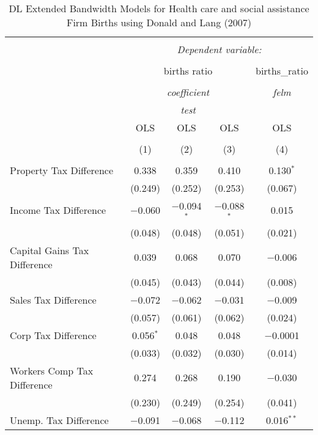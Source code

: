 
\begin{table}[!htbp] \centering 
  \caption{DL Extended Bandwidth Models for  Health care and social assistance Firm Births using Donald and Lang (2007)} 
  \label{} 
\begin{tabular}{@{\extracolsep{5pt}}lcccc} 
\\[-1.8ex]\hline 
\hline \\[-1.8ex] 
 & \multicolumn{4}{c}{\textit{Dependent variable:}} \\ 
\cline{2-5} 
\\[-1.8ex] & \multicolumn{3}{c}{births ratio} & births\_ratio \\ 
\\[-1.8ex] & \multicolumn{3}{c}{\textit{coefficient}} & \textit{felm} \\ 
 & \multicolumn{3}{c}{\textit{test}} & \textit{} \\ 
 & OLS & OLS & OLS & OLS \\ 
\\[-1.8ex] & (1) & (2) & (3) & (4)\\ 
\hline \\[-1.8ex] 
 Property Tax Difference & 0.338 & 0.359 & 0.410 & 0.130$^{*}$ \\ 
  & (0.249) & (0.252) & (0.253) & (0.067) \\ 
  Income Tax Difference & $-$0.060 & $-$0.094$^{*}$ & $-$0.088$^{*}$ & 0.015 \\ 
  & (0.048) & (0.048) & (0.051) & (0.021) \\ 
  Capital Gains Tax Difference & 0.039 & 0.068 & 0.070 & $-$0.006 \\ 
  & (0.045) & (0.043) & (0.044) & (0.008) \\ 
  Sales Tax Difference & $-$0.072 & $-$0.062 & $-$0.031 & $-$0.009 \\ 
  & (0.057) & (0.061) & (0.062) & (0.024) \\ 
  Corp Tax Difference & 0.056$^{*}$ & 0.048 & 0.048 & $-$0.0001 \\ 
  & (0.033) & (0.032) & (0.030) & (0.014) \\ 
  Workers Comp Tax Difference & 0.274 & 0.268 & 0.190 & $-$0.030 \\ 
  & (0.230) & (0.249) & (0.254) & (0.041) \\ 
  Unemp. Tax Difference & $-$0.091 & $-$0.068 & $-$0.112 & 0.016$^{**}$ \\ 

\end{tabular}
\end{table}
